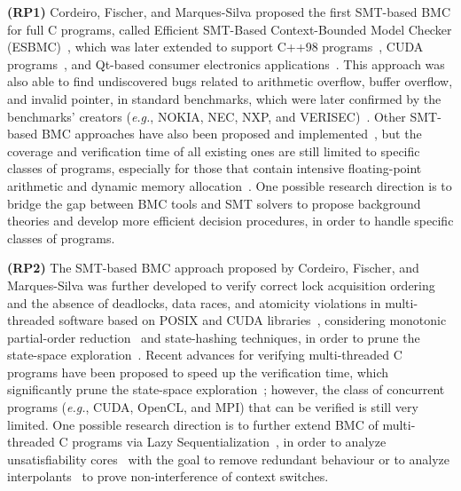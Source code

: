 \documentclass{acm_sen_article}
\begin{document}
\textbf{(RP1)} Cordeiro, Fischer, and Marques-Silva proposed the first SMT-based BMC for full C programs, called Efficient SMT-Based Context-Bounded Model Checker (ESBMC)~\cite{Cordeiro12}, which was later extended to support C++98 programs~\cite{ECBS13}, CUDA programs~\cite{Pereira15}, and Qt-based consumer electronics applications~\cite{Sousa15}. This approach was also able to find undiscovered bugs related to arithmetic overflow, buffer overflow, and invalid pointer, in standard benchmarks, which were later confirmed by the benchmarks' creators ({\it e.g.}, NOKIA, NEC, NXP, and VERISEC)~\cite{CordeiroF11,Cordeiro12}. Other SMT-based BMC approaches have also been proposed and implemented~\cite{MerzFS12}, but the coverage and verification time of all existing ones are still limited to specific classes of programs, especially for those that contain intensive floating-point arithmetic and dynamic memory allocation~\cite{Beyer14,BeyerSVCOMP15}. One possible research direction is to bridge the gap between BMC tools and SMT solvers to propose background theories and develop more efficient decision procedures, in order to handle specific classes of programs.

\textbf{(RP2)} The SMT-based BMC approach proposed by Cordeiro, Fischer, and Marques-Silva was further developed to verify correct lock acquisition ordering and the absence of deadlocks, data races, and atomicity violations in multi-threaded software based on POSIX and CUDA libraries~\cite{CordeiroF11,Pereira15}, considering monotonic partial-order reduction~\cite{KahlonWG09} and state-hashing techniques, in order to prune the state-space exploration~\cite{morse15}. Recent advances for verifying multi-threaded C programs have been proposed to speed up the verification time, which significantly prune the state-space exploration~\cite{Inverso14,civl15}; however, the class of concurrent programs ({\it e.g.}, CUDA, OpenCL, and MPI) that can be verified is still very limited. One possible research direction is to further extend BMC of multi-threaded C programs via Lazy Sequentialization~\cite{Inverso14}, in order to analyze unsatisfiability cores~\cite{Grumberg05} with the goal to remove redundant behaviour or to analyze interpolants~\cite{McMillan11} to prove non-interference of context switches.
\end{document}

